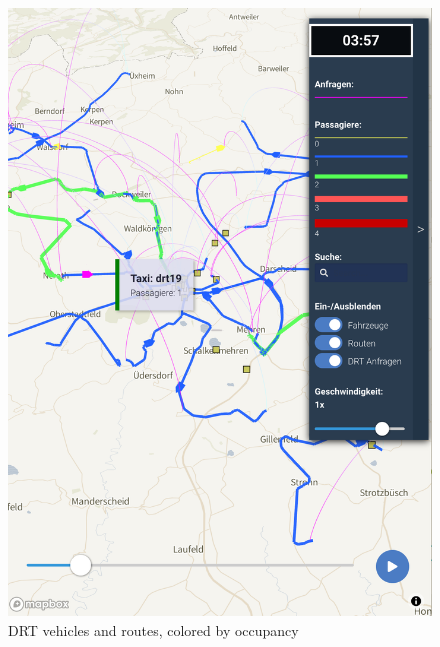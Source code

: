 \begin{figure}[ht]
\centering
\begin{minipage}[c]{0.45\textwidth}
   \includegraphics[width=\linewidth]{chapters/22-avov/images/fig-drt-vehicles.png}
   \caption{DRT vehicles and routes, colored by occupancy}
   \label{fig:avov-drt-vehicles-routes}
\end{minipage}
\begin{minipage}[c]{0.45\textwidth}

\end{minipage}
\end{figure}
